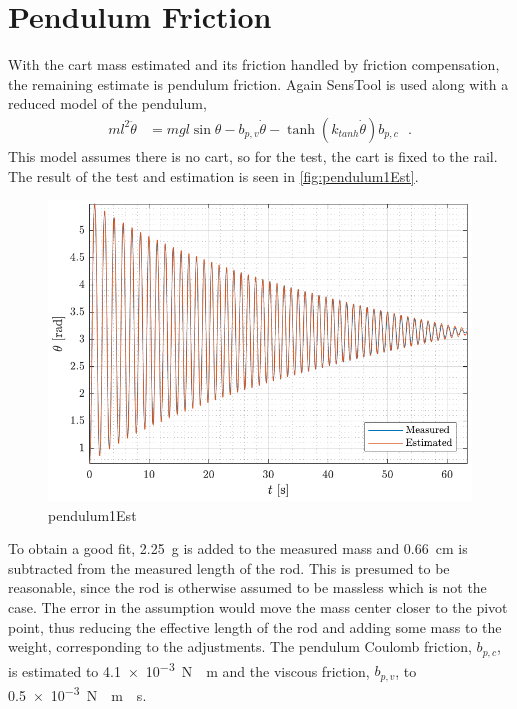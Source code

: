 \section{Pendulum Friction}
With the cart mass estimated and its friction handled by friction compensation, the remaining estimate is pendulum friction. Again SensTool is used along with a reduced model of the pendulum,
%
\begin{align}
  m l ^2 \ddot{\theta} &= m g l  \sin \theta - b_{p,v} \dot{\theta} - \tanh(k_{tanh} \dot{\theta}) b_{p,c} \ \ \ .
  \label{eq:reducedForPendulum1Estimation}
\end{align}
%
This model assumes there is no cart, so for the test, the cart is fixed to the rail. The result of the test and estimation is seen in \autoref{fig:pendulum1Est}.
%
\begin{figure}[H]
  \includegraphics[width=.7\textwidth]{figures/pendulum1Est}
  \caption{pendulum1Est}
  \label{fig:pendulum1Est}
\end{figure}
%
To obtain a good fit, \SI{2.25}{g} is added to the measured mass and \SI{0.66}{cm} is subtracted from the measured length of the rod. This is presumed to be reasonable, since the rod is otherwise assumed to be massless which is not the case. The error in the assumption would move the mass center closer to the pivot point, thus reducing the effective length of the rod and adding some mass to the weight, corresponding to the adjustments. The pendulum Coulomb friction, $b_{p,c}$, is estimated to \SI{4.1e-3}{N\cdot m} and the viscous friction, $b_{p,v}$, to \SI{0.5e-3}{N\cdot m\cdot s}.

